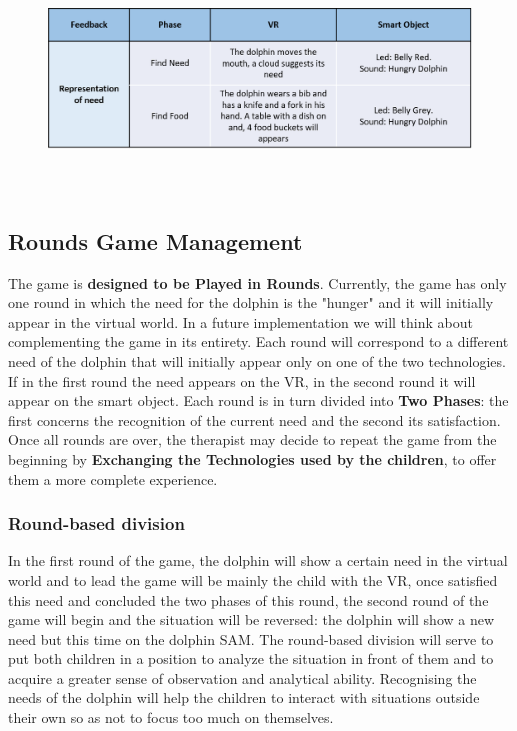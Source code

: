 \documentclass [12pt]{article}
\begin{document}
\begin{figure}[ht!]
\centering
\includegraphics[height=6cm,width=15cm]{FeedbackUX2.png}
\end{figure}
\clearpage

\subsection{Rounds Game Management}
The game is \textbf{designed to be Played in Rounds}. Currently, the game has only one round in which the need for the dolphin is the "hunger" and it  will initially appear in the virtual world. In a future implementation we will think about complementing the game in its entirety. 
Each round will correspond to a different need of the dolphin that will initially appear only on one of the two technologies. If in the first round the need appears on the VR, in the second round it will appear on the smart object. Each round is in turn divided into \textbf{Two Phases}: the first concerns the recognition of the current need and the second its satisfaction. Once all rounds are over, the therapist may decide to repeat the game from the beginning by \textbf{Exchanging the Technologies used by the children}, to offer them a more complete experience.
\subsubsection{Round-based division}
In the first round of the game, the dolphin will show a certain need in the virtual world and to lead the game will be mainly the child with the VR, once satisfied this need and concluded the two phases of this round, the second round of the game will begin and the situation will be reversed: the dolphin will show a new need but this time on the dolphin SAM. The round-based division will serve to put both children in a position to analyze the situation in front of them and to acquire a greater sense of observation and analytical ability. Recognising the needs of the dolphin will help the children to interact with situations outside their own so as not to focus too much on themselves.
\end{document}
